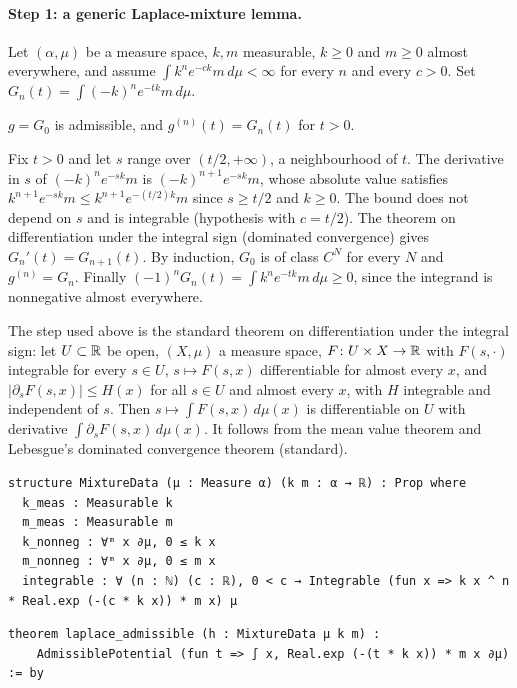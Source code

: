 \paragraph{Step 1: a generic Laplace-mixture lemma.} Let $(\alpha,\mu)$ be a measure space, $k,m$ measurable,
$k\ge0$ and $m\ge0$ almost everywhere, and assume $\int k^ne^{-ck}m\,d\mu<\infty$ for every $n$ and every $c>0$. Set
$G_n(t)=\int(-k)^ne^{-tk}m\,d\mu$.
\begin{theorem}\label{ch2:thm:laplace}
$g=G_0$ is admissible, and $g^{(n)}(t)=G_n(t)$ for $t>0$. \tierA
\end{theorem}
\begin{humanproof}
Fix $t>0$ and let $s$ range over $(t/2,+\infty)$, a neighbourhood of $t$. The derivative in $s$ of $(-k)^ne^{-sk}m$ is
$(-k)^{n+1}e^{-sk}m$, whose absolute value satisfies $k^{n+1}e^{-sk}m\le k^{n+1}e^{-(t/2)k}m$ since $s\ge t/2$ and
$k\ge0$. The bound does not depend on $s$ and is integrable (hypothesis with $c=t/2$). The theorem on differentiation
under the integral sign (dominated convergence) gives $G_n'(t)=G_{n+1}(t)$. By induction, $G_0$ is of class $C^N$ for
every $N$ and $g^{(n)}=G_n$. Finally $(-1)^nG_n(t)=\int k^ne^{-tk}m\,d\mu\ge0$, since the integrand is nonnegative almost
everywhere.
\end{humanproof}
\begin{uniremark}\tierL{} The step used above is the standard theorem on differentiation under the integral sign: let
$U\subset\mathbb{R}$ be open, $(X,\mu)$ a measure space, $F\colon U\times X\to\mathbb{R}$ with $F(s,\cdot)$ integrable for every $s\in U$, $s\mapsto F(s,x)$
differentiable for almost every $x$, and $|\partial_sF(s,x)|\le H(x)$ for all $s\in U$ and almost every $x$, with $H$
integrable and independent of $s$. Then $s\mapsto\int F(s,x)\,d\mu(x)$ is differentiable on $U$ with derivative
$\int\partial_sF(s,x)\,d\mu(x)$. It follows from the mean value theorem and Lebesgue's dominated convergence theorem
(standard).
\end{uniremark}
\begin{leanbox}
\begin{lstlisting}[style=chdeux]
structure MixtureData (μ : Measure α) (k m : α → ℝ) : Prop where
  k_meas : Measurable k
  m_meas : Measurable m
  k_nonneg : ∀ᵐ x ∂μ, 0 ≤ k x
  m_nonneg : ∀ᵐ x ∂μ, 0 ≤ m x
  integrable : ∀ (n : ℕ) (c : ℝ), 0 < c → Integrable (fun x => k x ^ n * Real.exp (-(c * k x)) * m x) μ
\end{lstlisting}
\begin{lstlisting}[style=chdeux]
theorem laplace_admissible (h : MixtureData μ k m) :
    AdmissiblePotential (fun t => ∫ x, Real.exp (-(t * k x)) * m x ∂μ) := by
\end{lstlisting}
\end{leanbox}

